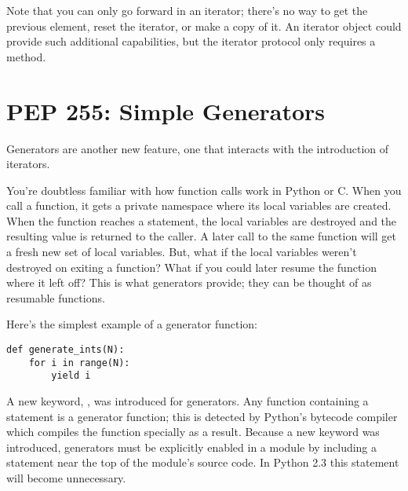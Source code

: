 \documentclass{howto}
\begin{document}
Note that you can only go forward in an iterator; there's no way to
get the previous element, reset the iterator, or make a copy of it.
An iterator object could provide such additional capabilities, but the
iterator protocol only requires a  method.

\begin{seealso}


\end{seealso}


\section{PEP 255: Simple Generators}

Generators are another new feature, one that interacts with the
introduction of iterators.

You're doubtless familiar with how function calls work in Python or
C.  When you call a function, it gets a private namespace where its local
variables are created.  When the function reaches a 
statement, the local variables are destroyed and the resulting value
is returned to the caller.  A later call to the same function will get
a fresh new set of local variables.  But, what if the local variables
weren't destroyed on exiting a function?  What if you could later
resume the function where it left off?  This is what generators
provide; they can be thought of as resumable functions.

Here's the simplest example of a generator function:

\begin{verbatim}
def generate_ints(N):
    for i in range(N):
        yield i
\end{verbatim}

A new keyword, , was introduced for generators.  Any
function containing a  statement is a generator
function; this is detected by Python's bytecode compiler which
compiles the function specially as a result.  Because a new keyword was
introduced, generators must be explicitly enabled in a module by
including a  statement near
the top of the module's source code.  In Python 2.3 this statement
will become unnecessary.
\end{document}
